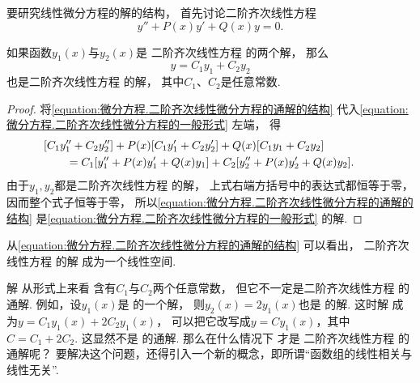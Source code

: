 要研究线性微分方程的解的结构，
首先讨论二阶齐次线性方程\begin{equation}\label{equation:微分方程.二阶齐次线性微分方程的一般形式}
	y'' + P(x) y' + Q(x) y = 0.
\end{equation}

\begin{theorem}
如果函数\(y_1(x)\)与\(y_2(x)\)是
二阶齐次线性方程  的两个解，
那么\begin{equation}\label{equation:微分方程.二阶齐次线性微分方程的通解的结构}
	y = C_1 y_1 + C_2 y_2
\end{equation}
也是二阶齐次线性方程  的解，
其中\(C_1\)、\(C_2\)是任意常数.
\begin{proof}
将\cref{equation:微分方程.二阶齐次线性微分方程的通解的结构}
代入\cref{equation:微分方程.二阶齐次线性微分方程的一般形式} 左端，
得\begin{align*}
	&\hspace{-20pt}
	[C_1 y_1'' + C_2 y_2'']
	+ P(x) [C_1 y_1' + C_2 y_2']
	+ Q(x) [C_1 y_1 + C_2 y_2] \\
	&= C_1 [y_1'' + P(x) y_1' + Q(x) y_1]
	+ C_2 [y_2'' + P(x) y_2' + Q(x) y_2].
\end{align*}
由于\(y_1,y_2\)都是二阶齐次线性方程  的解，
上式右端方括号中的表达式都恒等于零，
因而整个式子恒等于零，
所以\cref{equation:微分方程.二阶齐次线性微分方程的通解的结构}
是\cref{equation:微分方程.二阶齐次线性微分方程的一般形式} 的解.
\end{proof}
\end{theorem}
从\cref{equation:微分方程.二阶齐次线性微分方程的通解的结构} 可以看出，
二阶齐次线性方程  的解
成为一个线性空间.

解  从形式上来看
含有\(C_1\)与\(C_2\)两个任意常数，
但它不一定是二阶齐次线性方程  的通解.
例如，设\(y_1(x)\)是  的一个解，
则\(y_2(x)=2 y_1(x)\)也是  的解.
这时解  成为\(y = C_1 y_1(x) + 2 C_2 y_1(x)\)，
可以把它改写成\(y = C y_1(x)\)，其中\(C = C_1 + 2 C_2\).
这显然不是  的通解.
那么在什么情况下  才是%
二阶齐次线性方程  的通解呢？
要解决这个问题，还得引入一个新的概念，即所谓“函数组的线性相关与线性无关”.

